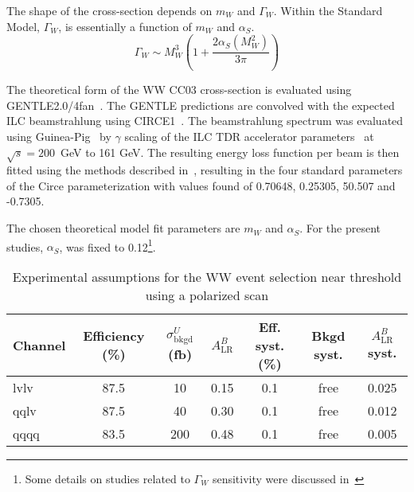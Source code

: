 \documentclass[12pt]{article}
\begin{document}
The shape of the cross-section depends on $m_{W}$ and $\Gamma_{W}$. 
Within the Standard Model, $\Gamma_{W}$, is essentially a function 
of $m_{W}$ and $\alpha_S$.
\begin{equation}
\Gamma_W \sim {M_W^3} \left( 1 + \frac{2 \alpha_S( M_W^2) } { 3 \pi} \right) 
\end{equation}

The theoretical form of the WW CC03 cross-section is evaluated 
using GENTLE2.0/4fan~\cite{Bardin:1996zz}. 
The GENTLE predictions are convolved with the expected ILC beamstrahlung 
using CIRCE1~\cite{Ohl:1996fi}. The beamstrahlung spectrum was evaluated using Guinea-Pig~\cite{Schulte:1998au} 
by $\gamma$ scaling of the ILC TDR accelerator parameters~\cite{ILC_TDR_BASELINE} at $\sqrt{s}=200$~GeV to 161 GeV. 
The resulting energy loss function per beam is then fitted using the methods described in~\cite{Sailer:2009zz}, 
resulting in the four standard parameters of the Circe parameterization with 
values found of 0.70648, 0.25305, 50.507 and -0.7305.

The chosen theoretical model fit parameters are $m_{W}$ and $\alpha_S$. 
For the present studies, $\alpha_S$, was fixed to 0.12\footnote{Some details on studies related to $\Gamma_W$ sensitivity 
were discussed in~\cite{Wilson_TDR2}}.

\begin{table}[!htb]
\begin{center}
\begin{tabular}{l|c|c|c|c|c|c}
Channel   & Efficiency (\%) & $\sigma^U_{\mathrm{bkgd}}$ (fb) & $A_{\mathrm{LR}}^B$ & Eff. syst. (\%) 
& Bkgd syst.  & $A_{\mathrm{LR}}^B$ syst.\\ \hline
lvlv        &       87.5   &   10  & 0.15 &      0.1        &   free      & 0.025    \\
qqlv        &       87.5   &   40  & 0.30 &      0.1        &   free      & 0.012    \\
qqqq        &       83.5   &  200  & 0.48 &      0.1        &   free      & 0.005    \\ \hline
\end{tabular}
\caption{Experimental assumptions for the WW event selection near threshold using a polarized scan}
\label{tab:Assumptions}
\end{center}
\end{table} 
\end{document}
